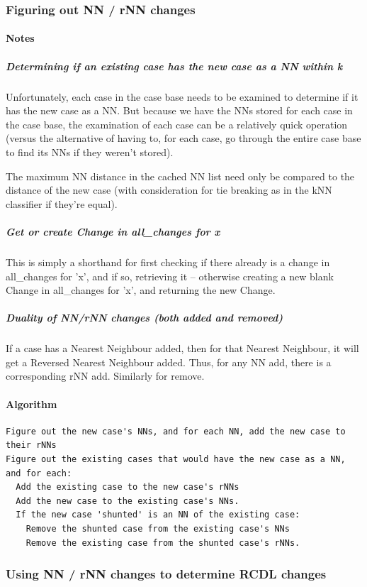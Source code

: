 \documentclass[a4paper,11pt]{report}
\begin{document}
\subsubsection{Figuring out NN / rNN changes}
\paragraph{Notes}
\subparagraph{Determining if an existing case has the new case as a NN within k}
Unfortunately, each case in the case base needs to be examined to determine if it has the new case as a NN. But because we have the NNs stored for each case in the case base, the examination of each case can be a relatively quick operation (versus the alternative of having to, for each case, go through the entire case base to find its NNs if they weren't stored).

The maximum NN distance in the cached NN list need only be compared to the distance of the new case (with consideration for tie breaking as in the kNN classifier if they're equal).

\subparagraph{Get or create Change in all\_changes for x}
This is simply a shorthand for first checking if there already is a change in all\_changes for 'x', and if so, retrieving it – otherwise creating a new blank Change in all\_changes for 'x', and returning the new Change.

\subparagraph{Duality of NN/rNN changes (both added and removed)}
If a case has a Nearest Neighbour added, then for that Nearest Neighbour, it will get a Reversed Nearest Neighbour added. Thus, for any NN add, there is a corresponding rNN add. Similarly for remove.


\paragraph{Algorithm}

\begin{verbatim}
Figure out the new case's NNs, and for each NN, add the new case to their rNNs
Figure out the existing cases that would have the new case as a NN, and for each:
  Add the existing case to the new case's rNNs
  Add the new case to the existing case's NNs.
  If the new case 'shunted' is an NN of the existing case:
    Remove the shunted case from the existing case's NNs
    Remove the existing case from the shunted case's rNNs.
\end{verbatim}

\subsubsection{Using NN / rNN changes to determine RCDL changes}
\end{document}
